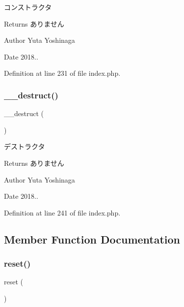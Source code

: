 コンストラクタ 

\begin{DoxyReturn}{Returns}
ありません 
\end{DoxyReturn}
\begin{DoxyAuthor}{Author}
Yuta Yoshinaga 
\end{DoxyAuthor}
\begin{DoxyDate}{Date}
2018.. 
\end{DoxyDate}


Definition at line 231 of file index.\+php.

\mbox{\label{class_c_ajax_utility_a421831a265621325e1fdd19aace0c758}} 
\subsubsection{\texorpdfstring{\+\_\+\+\_\+destruct()}{\_\_destruct()}}
{\footnotesize\ttfamily \+\_\+\+\_\+destruct (\begin{DoxyParamCaption}{ }\end{DoxyParamCaption})}



デストラクタ 

\begin{DoxyReturn}{Returns}
ありません 
\end{DoxyReturn}
\begin{DoxyAuthor}{Author}
Yuta Yoshinaga 
\end{DoxyAuthor}
\begin{DoxyDate}{Date}
2018.. 
\end{DoxyDate}


Definition at line 241 of file index.\+php.



\subsection{Member Function Documentation}
\mbox{\label{class_c_ajax_utility_a4a20559544fdf4dcb457e258dc976cf8}} 
\subsubsection{\texorpdfstring{reset()}{reset()}}
{\footnotesize\ttfamily reset (\begin{DoxyParamCaption}{ }\end{DoxyParamCaption})}



